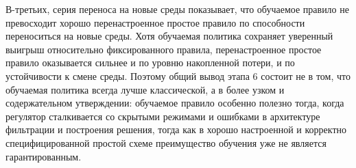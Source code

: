 В-третьих, серия переноса на новые среды показывает, что обучаемое правило не превосходит хорошо перенастроенное простое правило по способности переноситься на новые среды. Хотя обучаемая политика сохраняет уверенный выигрыш относительно фиксированного правила, перенастроенное простое правило оказывается сильнее и по уровню накопленной потери, и по устойчивости к смене среды. Поэтому общий вывод этапа 6 состоит не в том, что обучаемая политика всегда лучше классической, а в более узком и содержательном утверждении: обучаемое правило особенно полезно тогда, когда регулятор сталкивается со скрытыми режимами и ошибками в архитектуре фильтрации и построения решения, тогда как в хорошо настроенной и корректно специфицированной простой схеме преимущество обучения уже не является гарантированным.

